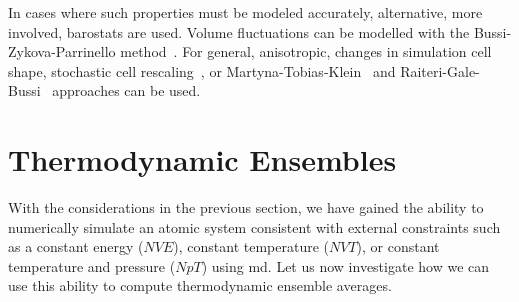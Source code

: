 In cases where such properties must be modeled accurately, alternative, more involved, barostats are used.
Volume fluctuations can be modelled with the Bussi-Zykova-Parrinello method~\cite{bzp2009p}.
For general, anisotropic, changes in simulation cell shape, stochastic cell rescaling~\cite{bb2020p,drbb2022p}, or Martyna-Tobias-Klein~\cite{mtk1994p} and Raiteri-Gale-Bussi~\cite{rgb2011p} approaches can be used.

\section{Thermodynamic Ensembles}

With the considerations in the previous section, we have gained the ability to numerically simulate an atomic system consistent with external constraints such as a constant energy ($NVE$), constant temperature ($NVT$), or constant temperature and pressure ($NpT$) using \gls{md}. Let us now investigate how we can use this ability to compute thermodynamic ensemble averages.

